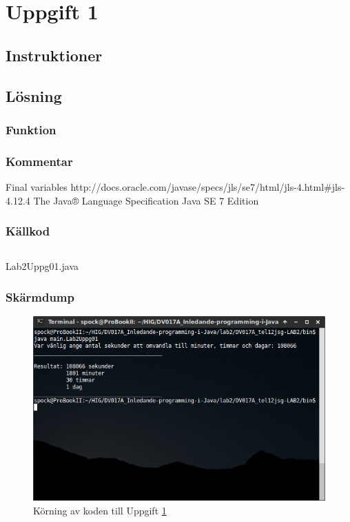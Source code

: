 \section{Uppgift 1}\label{sec:uppg01}

\subsection{Instruktioner}


\subsection{Lösning}
\subsubsection{Funktion}

\subsubsection{Kommentar}


Final variables
http://docs.oracle.com/javase/specs/jls/se7/html/jls-4.html#jls-4.12.4
The Java® Language Specification
Java SE 7 Edition


\subsubsection{Källkod}
\inputminted[linenos]{java}{src/Lab2Uppg01.java}
\caption{Lab2Uppg01.java}
\label{src:uppg01}


\subsubsection{Skärmdump}
\begin{figure}[htbp]
    \centering
        \includegraphics[width=\linewidth]{img/01.png}
    \caption{Körning av koden till Uppgift \ref{sec:uppg01}}
    \label{fig:uppg01-screenshot}
\end{figure}

